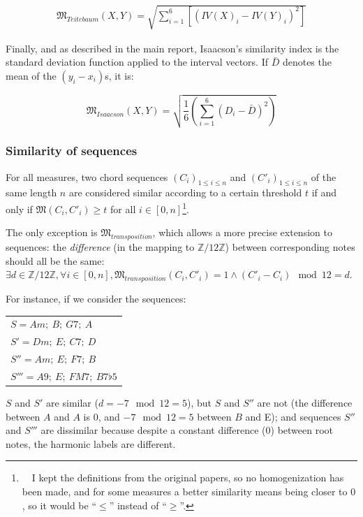 \documentclass[a4paper,10pt]{article}
\newcommand{\guill}[1]{``#1''}
\begin{document}
\begin{align*}
\mathfrak{M}_{Teitebaum}(X,Y) = \sqrt{\sum_{i=1}^6 \left[(IV(X)_i-IV(Y)_i)^2\right]}
\end{align*}

Finally, and as described in the main report, Isaacson's similarity index is the standard deviation function applied to the interval vectors. If $\bar{D}$ denotes the mean of the $(y_i-x_i)$s, it is:

\begin{equation*}
\mathfrak{M}_{Isaacson}(X,Y) = \sqrt{\frac{1}{6}\left(\sum_{i=1}^6\left(D_i-\bar{D}\right)^2\right)}
\end{equation*}

\subsubsection*{Similarity of sequences}

For all measures, two chord sequences $(C_i)_{1\leq i\leq n}$ and $(C'_i)_{1\leq i\leq n}$ of the same length $n$ are considered similar according to a certain threshold $t$ 
if and only if $\mathfrak{M}(C_i,C'_i) \geq t$ for all $i\in [0,n]$\footnote{~~I kept the definitions from the original papers, so no homogenization has been made, and for some measures a better similarity means being closer to $0$, so it would be \guill{$\leq$} instead of \guill{$\geq$}.}.

The only exception is $\mathfrak{M}_{transposition}$, which allows a more precise extension to sequences: the \emph{difference} (in the mapping to $\mathbb{Z}/12\mathbb{Z}$) between corresponding notes should all be the same: $\exists d \in \mathbb{Z}/12\mathbb{Z}, \forall i\in [0,n], \mathfrak{M}_{transposition}(C_i,C'_i) = 1 \wedge (C'_i-C_i)\mod12 = d$.

For instance, if we consider the sequences:

\begin{center}
\begin{tabular}{l}
$S = Am;~B;~G7;~A$ \\
$S' = Dm;~E;~C7;~D$ \\
$S'' = Am;~E;~F7;~B$ \\
$S''' = A9;~E;~FM7;~B7\flat5$ \\
\end{tabular}
\end{center}

$S$ and $S'$ are similar ($d=-7\mod12=5$), but $S$ and $S''$ are not (the difference between $A$ and $A$ is $0$, and $-7\mod12=5$ between $B$ and E); and sequences $S''$ and $S'''$ are dissimilar because despite a constant difference ($0$) between root notes, the harmonic labels are different.
\end{document}

